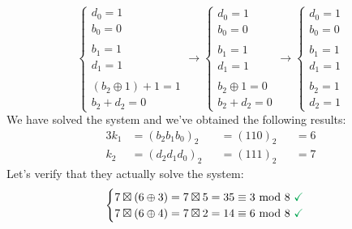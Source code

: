 \documentclass[11pt, a4paper]{article}
\newcommand{\mymod}{
    \text{ mod }
}
\begin{document}
\begin{equation*}
    \begin{cases}
        
        d_0=1\\
        b_0=0\\\\
        
        b_1=1\\
        d_1=1\\\\
        
        (b_2\oplus1)+1=1\\
        b_2+d_2=0
        
    \end{cases}\longrightarrow
    \begin{cases}
        
        d_0=1\\
        b_0=0\\\\
        
        b_1=1\\
        d_1=1\\\\
        
        b_2\oplus1=0\\
        b_2+d_2=0
        
    \end{cases}\longrightarrow
    \begin{cases}
        
        d_0=1\\
        b_0=0\\\\
        
        b_1=1\\
        d_1=1\\\\
        
        b_2=1\\
        d_2=1
        
    \end{cases}
\end{equation*}
We have solved the system and we've obtained the following results:
\begin{alignat*}{3}
    k_1&=(b_2b_1b_0)_2&&=(110)_2&&=6\\
    k_2&=(d_2d_1d_0)_2&&=(111)_2&&=7
\end{alignat*}
Let's verify that they actually solve the system:
\begin{equation*}
    \begin{cases}
        7\boxtimes(6\oplus3)=7\boxtimes5=35\equiv3\mymod8\text{ \textcolor{Green}{\checkmark}}\\
        7\boxtimes(6\oplus4)=7\boxtimes2=14\equiv6\mymod8\text{ \textcolor{Green}{\checkmark}}
    \end{cases}
\end{equation*}
\end{document}
